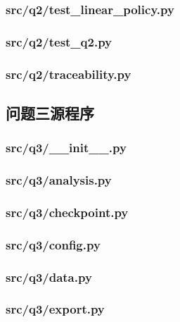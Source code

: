 \documentclass[zihao=-4,a4paper,UTF8,fontset=none]{ctexart}
\begin{document}
\subsubsection*{src/q2/test\_linear\_policy.py}


\subsubsection*{src/q2/test\_q2.py}


\subsubsection*{src/q2/traceability.py}


\subsection{问题三源程序}
\subsubsection*{src/q3/\_\_init\_\_.py}


\subsubsection*{src/q3/analysis.py}


\subsubsection*{src/q3/checkpoint.py}


\subsubsection*{src/q3/config.py}


\subsubsection*{src/q3/data.py}


\subsubsection*{src/q3/export.py}

\end{document}
